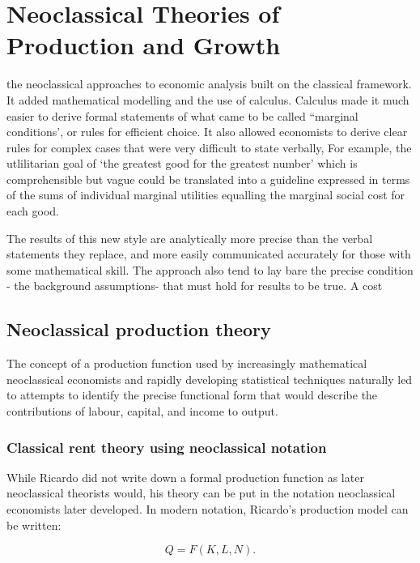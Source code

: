 \chapter{Neoclassical Theories of Production and Growth} 
\label{chapter-growth}

the \gls{neoclassical} approaches to economic analysis built on the classical framework. It added  mathematical modelling and the use of calculus. Calculus made it much easier to derive formal statements of what came to be called ``marginal conditions', or rules for efficient choice. It also allowed economists to derive clear rules for complex cases that were very difficult to state verbally, For example, the utlilitarian goal of `the greatest good for the greatest number' which is comprehensible but vague could be translated into a guideline expressed in terms of the sums of individual marginal utilities equalling the marginal social cost for each good. 

The results of this new style are analytically more precise than the verbal statements they replace, and more easily communicated accurately for those with some mathematical skill. The approach also tend to lay bare the precise condition - the background assumptions- that must hold for results to be true. A cost 




\section{Neoclassical production theory}
The concept of a production function used by increasingly mathematical neoclassical economists and  rapidly developing statistical techniques  naturally led to attempts to identify the precise functional form that would describe the contributions of labour, capital, and income to output.
 


\subsection{Classical rent theory using neoclassical notation}
While Ricardo did not write down a formal production function as later \gls{neoclassical} theorists would, his theory can be put in the notation neoclassical economists later developed. In modern notation, Ricardo's production model can be written: 

\begin{equation} 
Q=F(K,L,N).
\label{eqn-production-ricardo}
\end{equation} 

